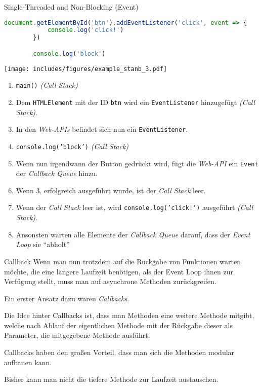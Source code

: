 \begin{example}{Single-Threaded and Non-Blocking (Event)}
    \begin{lstlisting}[language=JavaScript]
        document.getElementById('btn').addEventListener('click', event => {
            console.log('click!')
        })

        console.log('block')
    \end{lstlisting}

    \texttt{[image: includes/figures/example\_stanb\_3.pdf]}

    \begin{enumerate}
        \item \texttt{main()} \emph{(Call Stack)}
        \item Dem \texttt{HTMLElement} mit der ID \texttt{btn} wird ein \texttt{EventListener} hinzugefügt \emph{(Call Stack)}.
        \item In den \emph{Web-APIs} befindet sich nun ein \texttt{EventListener}.
        \item \texttt{console.log('block')} \emph{(Call Stack)}
        \item Wenn nun irgendwann der Button gedrückt wird, fügt die \emph{Web-API} ein \texttt{Event} der \emph{Callback Queue} hinzu.
        \item Wenn 3. erfolgreich ausgeführt wurde, ist der \emph{Call Stack} leer.
        \item Wenn der \emph{Call Stack} leer ist, wird \texttt{console.log('click!')} ausgeführt \emph{(Call Stack)}.
        \item Ansonsten warten alle Elemente der \emph{Callback Queue} darauf, dass der \emph{Event Loop} sie \enquote{abholt}
    \end{enumerate}
\end{example}

\begin{defi}{Callback}
    Wenn man nun trotzdem auf die Rückgabe von Funktionen warten möchte, die eine längere Laufzeit benötigen, als der Event Loop ihnen zur Verfügung stellt, muss man auf asynchrone Methoden zurückgreifen.

    Ein erster Ansatz dazu waren \emph{Callbacks}.

    Die Idee hinter Callbacks ist, dass man Methoden eine weitere Methode mitgibt, welche nach Ablauf der eigentlichen Methode mit der Rückgabe dieser als Parameter, die mitgegebene Methode ausführt.

    Callbacks haben den großen Vorteil, dass man sich die Methoden modular aufbauen kann.

    Bisher kann man nicht die tiefere Methode zur Laufzeit austauschen.
\end{defi}

